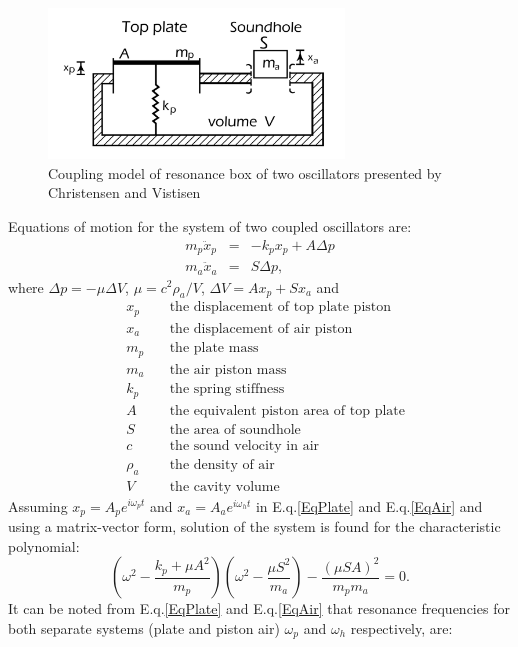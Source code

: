 \begin{figure}[h]
\centering
\includegraphics[height=4cm]{img/Top-Air.png}
\caption{Coupling model of resonance box of two oscillators presented by Christensen and Vistisen}
\label{Top-Air}
\end{figure}


Equations of motion for the system of two coupled oscillators are:
\begin{eqnarray}
m_{p}\ddot{x}_p & = & - k_p x_p  + A \Delta p
\label{EqPlate}\\
m_{a}\ddot{x}_a & = & S \Delta p,
\label{EqAir}
\end{eqnarray}
where $\Delta p  = - \mu \Delta V$, $\mu= c^2 \rho_a / V$, $\Delta V  =  A x_p + S x_a$ and
\begin{eqnarray*}
& x_p \quad  &\text{the displacement of top plate piston}\\
& x_a \quad &\text{the displacement of air piston}\\
& m_p \quad &\text{the plate mass}\\
& m_a \quad &\text{the air piston mass}\\
& k_p \quad &\text{the spring stiffness}\\
& A \quad &\text{the equivalent piston area of top plate}\\
& S \quad &\text{the area of soundhole}\\
& c \quad &\text{the sound velocity in air}\\
& \rho_a \quad &\text{the density of air}\\
& V \quad &\text{the cavity volume}
\end{eqnarray*}
Assuming $x_p=A_p e^{i\omega_p t}$ and $x_a=A_a e^{i\omega_h t}$ in E.q.\ref{EqPlate} and E.q.\ref{EqAir} and using a matrix-vector form, solution of the system is found for the characteristic polynomial:
\begin{equation}
\left( \omega^2 - \frac{k_p + \mu A^2}{m_p} \right) \left( \omega^2 - \frac{\mu S^2}{m_a} \right) - \frac{(\mu SA)^2}{m_p m_a} =0.
\label{2Poly}
\end{equation}
It can be noted from E.q.\ref{EqPlate} and E.q.\ref{EqAir} that resonance frequencies for both separate systems (plate and piston air) $\omega_p$ and $\omega_h$ respectively, are:
